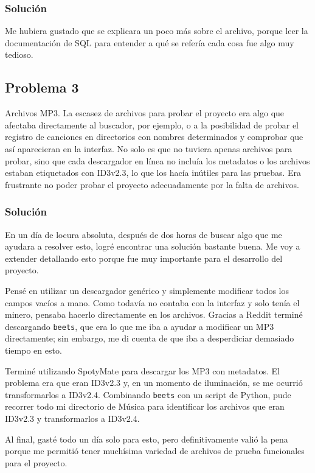 \documentclass[10pt,a4paper]{article}
\begin{document}
\subsubsection{Solución}
Me hubiera gustado que se explicara un poco más sobre el archivo, porque leer la documentación de SQL para entender a qué se refería cada cosa fue algo muy tedioso.

\subsection{Problema 3}
Archivos MP3. La escasez de archivos para probar el proyecto era algo que afectaba directamente al buscador, por ejemplo, o a la posibilidad de probar el registro de canciones en directorios con nombres determinados y comprobar que así aparecieran en la interfaz. No solo es que no tuviera apenas archivos para probar, sino que cada descargador en línea no incluía los metadatos o los archivos estaban etiquetados con ID3v2.3, lo que los hacía inútiles para las pruebas. Era frustrante no poder probar el proyecto adecuadamente por la falta de archivos.
\subsubsection{Solución}
En un día de locura absoluta, después de dos horas de buscar algo que me ayudara a resolver esto, logré encontrar una solución bastante buena. Me voy a extender detallando esto porque fue muy importante para el desarrollo del proyecto.

Pensé en utilizar un descargador genérico y simplemente modificar todos los campos vacíos a mano. Como todavía no contaba con la interfaz y solo tenía el minero, pensaba hacerlo directamente en los archivos. Gracias a Reddit terminé descargando \texttt{beets}, que era lo que me iba a ayudar a modificar un MP3 directamente; sin embargo, me di cuenta de que iba a desperdiciar demasiado tiempo en esto.

Terminé utilizando SpotyMate para descargar los MP3 con metadatos. El problema era que eran ID3v2.3 y, en un momento de iluminación, se me ocurrió transformarlos a ID3v2.4. Combinando \texttt{beets} con un script de Python, pude recorrer todo mi directorio de Música para identificar los archivos que eran ID3v2.3 y transformarlos a ID3v2.4.

Al final, gasté todo un día solo para esto, pero definitivamente valió la pena porque me permitió tener muchísima variedad de archivos de prueba funcionales para el proyecto.
\end{document}
